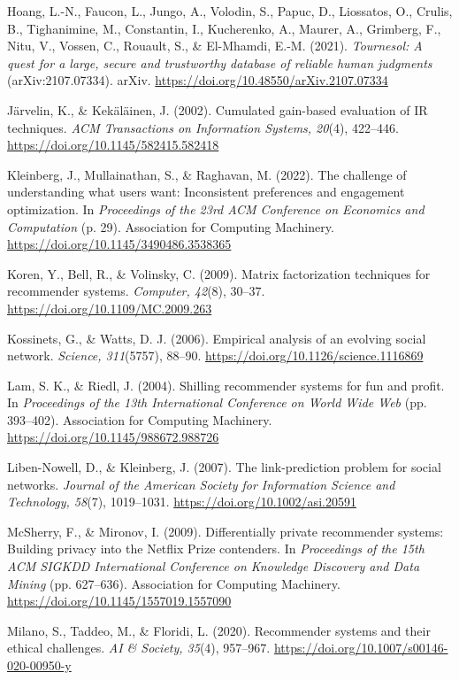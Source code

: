 \documentclass[11pt,letterpaper]{article}
\newenvironment{references}
  {\par\small\raggedright\setlength{\parskip}{3pt plus 1pt}\setlength{\parindent}{0pt}}
  {\par}
\newcommand{\refentry}{\par\noindent\hangindent=0.3in\hangafter=1\relax}
\begin{document}
\begin{references}
\refentry Hoang, L.-N., Faucon, L., Jungo, A., Volodin, S., Papuc, D., Liossatos, O., Crulis, B., Tighanimine,
M., Constantin, I., Kucherenko, A., Maurer, A., Grimberg, F., Nitu, V., Vossen, C., Rouault, S., \& El-Mhamdi,
E.-M. (2021). \textit{Tournesol: A quest for a large, secure and trustworthy database of reliable human
judgments} (arXiv:2107.07334). arXiv. \url{https://doi.org/10.48550/arXiv.2107.07334}

\refentry Järvelin, K., \& Kekäläinen, J. (2002). Cumulated gain-based evaluation of IR techniques.
\textit{ACM Transactions on Information Systems, 20}(4), 422--446. \url{https://doi.org/10.1145/582415.582418}

\refentry Kleinberg, J., Mullainathan, S., \& Raghavan, M. (2022). The challenge of understanding what users
want: Inconsistent preferences and engagement optimization. In \textit{Proceedings of the 23rd ACM Conference
on Economics and Computation} (p. 29). Association for Computing Machinery.
\url{https://doi.org/10.1145/3490486.3538365}

\refentry Koren, Y., Bell, R., \& Volinsky, C. (2009). Matrix factorization techniques for recommender
systems. \textit{Computer, 42}(8), 30--37. \url{https://doi.org/10.1109/MC.2009.263}

\refentry Kossinets, G., \& Watts, D. J. (2006). Empirical analysis of an evolving social network.
\textit{Science, 311}(5757), 88--90. \url{https://doi.org/10.1126/science.1116869}

\refentry Lam, S. K., \& Riedl, J. (2004). Shilling recommender systems for fun and profit. In
\textit{Proceedings of the 13th International Conference on World Wide Web} (pp. 393--402). Association for
Computing Machinery. \url{https://doi.org/10.1145/988672.988726}

\refentry Liben-Nowell, D., \& Kleinberg, J. (2007). The link-prediction problem for social networks.
\textit{Journal of the American Society for Information Science and Technology, 58}(7), 1019--1031.
\url{https://doi.org/10.1002/asi.20591}

\refentry McSherry, F., \& Mironov, I. (2009). Differentially private recommender systems: Building privacy
into the Netflix Prize contenders. In \textit{Proceedings of the 15th ACM SIGKDD International Conference on
Knowledge Discovery and Data Mining} (pp. 627--636). Association for Computing Machinery.
\url{https://doi.org/10.1145/1557019.1557090}

\refentry Milano, S., Taddeo, M., \& Floridi, L. (2020). Recommender systems and their ethical challenges.
\textit{AI \& Society, 35}(4), 957--967. \url{https://doi.org/10.1007/s00146-020-00950-y}


\end{references}
\end{document}
